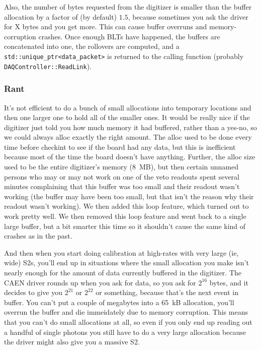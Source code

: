 Also, the number of bytes requested from the digitizer is smaller than the buffer allocation by a factor of (by default) $1.5$, because sometimes you ask the driver for X bytes and you get more.
This can cause buffer overruns and memory-corruption crashes.
Once enough BLTs have happened, the buffers are concatenated into one, the rollovers are computed, and a \texttt{std::unique\_ptr<data\_packet>} is returned to the calling function (probably \texttt{DAQController::ReadLink}).

\subsubsection{Rant}

It's not efficient to do a bunch of small allocations into temporary locations and then one larger one to hold all of the smaller ones.
It would be really nice if the digitizer just told you how much memory it had buffered, rather than a yes-no, so we could always alloc exactly the right amount.
The alloc used to be done every time before checkint to see if the board had any data, but this is inefficient because most of the time the board doesn't have anything.
Further, the alloc size used to be the entire digitizer's memory (8~MB), but then certain unnamed persons who may or may not work on one of the veto readouts spent several minutes complaining that this buffer was too small and their readout wasn't working (the buffer may have been too small, but that isn't the reason why their readout wasn't working).
We then added this loop feature, which turned out to work pretty well.
We then removed this loop feature and went back to a single large buffer, but a bit smarter this time so it shouldn't cause the same kind of crashes as in the past.

And then when you start doing calibration at high-rates with very large (ie, wide) S2s, you'll end up in situations where the small allocation you make isn't nearly enough for the amount of data currently buffered in the digitizer.
The CAEN driver rounds up when you ask for data, so you ask for $2^{16}$ bytes, and it decides to give you $2^{21}$ or $2^{22}$ or something, because that's the next event in buffer.
You can't put a couple of megabytes into a 65~kB allocation, you'll overrun the buffer and die immeidately due to memory corruption.
This means that you can't do small allocations at all, so even if you only end up reading out a handful of single photons you still have to do a very large allocation because the driver might also give you a massive S2.

